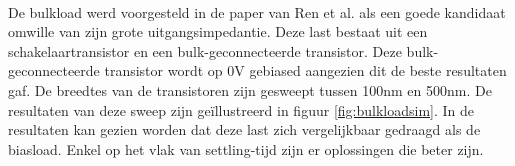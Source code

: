 \paragraph{}
De bulkload werd voorgesteld in de paper van Ren et al. \cite{bulkload} als een goede kandidaat omwille van zijn grote uitgangsimpedantie. Deze last bestaat uit een schakelaartransistor en een bulk-geconnecteerde transistor. Deze bulk-geconnecteerde transistor wordt op 0V gebiased aangezien dit de beste resultaten gaf. De breedtes van de transistoren zijn gesweept tussen 100nm en 500nm. De resultaten van deze sweep zijn geïllustreerd in figuur \ref{fig:bulkloadsim}. In de resultaten kan gezien worden dat deze last zich vergelijkbaar gedraagd als de biasload. Enkel op het vlak van settling-tijd zijn er oplossingen die beter zijn.

